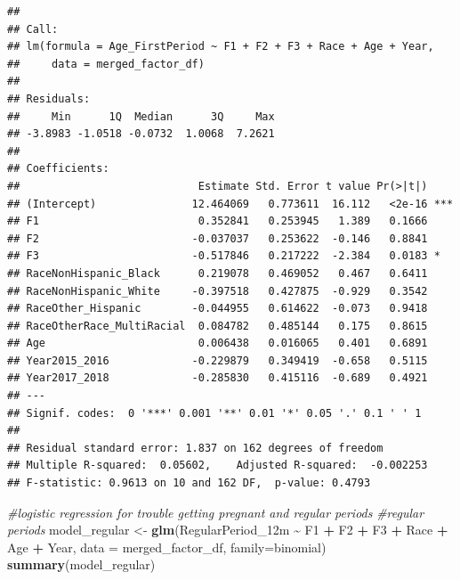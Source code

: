 \documentclass[
]{article}
\newenvironment{Shaded}{\begin{snugshade}}{\end{snugshade}}
\newcommand{\AttributeTok}[1]{\textcolor[rgb]{0.13,0.29,0.53}{#1}}
\newcommand{\CommentTok}[1]{\textcolor[rgb]{0.56,0.35,0.01}{\textit{#1}}}
\newcommand{\FunctionTok}[1]{\textcolor[rgb]{0.13,0.29,0.53}{\textbf{#1}}}
\newcommand{\NormalTok}[1]{#1}
\newcommand{\OtherTok}[1]{\textcolor[rgb]{0.56,0.35,0.01}{#1}}
\newcommand{\SpecialCharTok}[1]{\textcolor[rgb]{0.81,0.36,0.00}{\textbf{#1}}}
\begin{document}
\begin{verbatim}
## 
## Call:
## lm(formula = Age_FirstPeriod ~ F1 + F2 + F3 + Race + Age + Year, 
##     data = merged_factor_df)
## 
## Residuals:
##     Min      1Q  Median      3Q     Max 
## -3.8983 -1.0518 -0.0732  1.0068  7.2621 
## 
## Coefficients:
##                            Estimate Std. Error t value Pr(>|t|)    
## (Intercept)               12.464069   0.773611  16.112   <2e-16 ***
## F1                         0.352841   0.253945   1.389   0.1666    
## F2                        -0.037037   0.253622  -0.146   0.8841    
## F3                        -0.517846   0.217222  -2.384   0.0183 *  
## RaceNonHispanic_Black      0.219078   0.469052   0.467   0.6411    
## RaceNonHispanic_White     -0.397518   0.427875  -0.929   0.3542    
## RaceOther_Hispanic        -0.044955   0.614622  -0.073   0.9418    
## RaceOtherRace_MultiRacial  0.084782   0.485144   0.175   0.8615    
## Age                        0.006438   0.016065   0.401   0.6891    
## Year2015_2016             -0.229879   0.349419  -0.658   0.5115    
## Year2017_2018             -0.285830   0.415116  -0.689   0.4921    
## ---
## Signif. codes:  0 '***' 0.001 '**' 0.01 '*' 0.05 '.' 0.1 ' ' 1
## 
## Residual standard error: 1.837 on 162 degrees of freedom
## Multiple R-squared:  0.05602,    Adjusted R-squared:  -0.002253 
## F-statistic: 0.9613 on 10 and 162 DF,  p-value: 0.4793
\end{verbatim}

\begin{Shaded}
\begin{Highlighting}[]
\CommentTok{\#logistic regression for trouble getting pregnant and regular periods }
\CommentTok{\#regular periods}
\NormalTok{model\_regular }\OtherTok{\textless{}{-}} \FunctionTok{glm}\NormalTok{(RegularPeriod\_12m }\SpecialCharTok{\textasciitilde{}}\NormalTok{ F1 }\SpecialCharTok{+}\NormalTok{ F2 }\SpecialCharTok{+}\NormalTok{ F3 }\SpecialCharTok{+}\NormalTok{ Race }\SpecialCharTok{+}\NormalTok{ Age }\SpecialCharTok{+}\NormalTok{ Year, }\AttributeTok{data =}\NormalTok{ merged\_factor\_df,}
                     \AttributeTok{family=}\NormalTok{binomial)}
\FunctionTok{summary}\NormalTok{(model\_regular)}
\end{Highlighting}
\end{Shaded}
\end{document}
